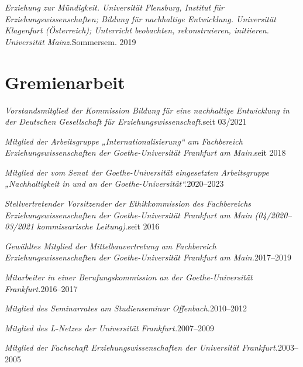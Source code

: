         \resumeProjectHeading
      {\textit{Erziehung zur Mündigkeit. Universität Flensburg, Institut für Erziehungswissenschaften; Bildung für nachhaltige Entwicklung. Universität Klagenfurt (Österreich); Unterricht beobachten, rekonstruieren, initiieren. Universität Mainz.}}{Sommersem. 2019}



  \resumeSubHeadingListEnd


\section{Gremienarbeit}
  \vspace{3pt}
  \resumeSubHeadingListStart
    \resumeProjectHeading
      {\textit{Vorstandsmitglied der Kommission Bildung für eine nachhaltige Entwicklung in der Deutschen Gesellschaft für Erziehungswissenschaft.}}{seit 03/2021}


        \resumeProjectHeading
      {\textit{Mitglied der Arbeitsgruppe „Internationalisierung“ am Fachbereich Erziehungswissenschaften der Goethe-Universität Frankfurt am Main.}}{seit 2018}


        \resumeProjectHeading
      {\textit{Mitglied der vom Senat der Goethe-Universität eingesetzten Arbeitsgruppe „Nachhaltigkeit in und an der Goethe-Universität“.}}{2020–2023}


        \resumeProjectHeading
      {\textit{Stellvertretender Vorsitzender der Ethikkommission des Fachbereichs Erziehungswissenschaften der Goethe-Universität Frankfurt am Main (04/2020–03/2021 kommissarische Leitung).}}{seit 2016}


        \resumeProjectHeading
      {\textit{Gewähltes Mitglied der Mittelbauvertretung am Fachbereich Erziehungswissenschaften der Goethe-Universität Frankfurt am Main.}}{2017–2019}


        \resumeProjectHeading
      {\textit{Mitarbeiter in einer Berufungskommission an der Goethe-Universität Frankfurt.}}{2016–2017}


        \resumeProjectHeading
      {\textit{Mitglied des Seminarrates am Studienseminar Offenbach.}}{2010–2012}


    \resumeProjectHeading
      {\textit{Mitglied des L-Netzes der Universität Frankfurt.}}{2007–2009}

        \resumeProjectHeading
      {\textit{Mitglied der Fachschaft Erziehungswissenschaften der Universität Frankfurt.}}{2003–2005}

  \resumeSubHeadingListEnd


